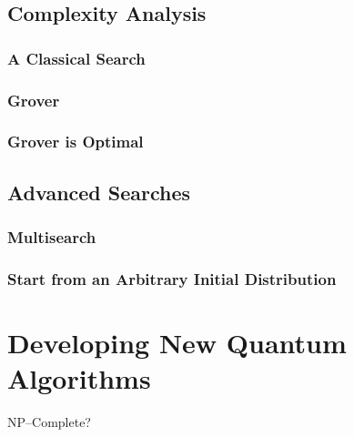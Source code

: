 \subsection{Complexity Analysis}


\subsubsection{A Classical Search}

\subsubsection{Grover}


\subsubsection{Grover is Optimal}


\subsection{Advanced Searches}

\subsubsection{Multisearch}

\subsubsection{Start from an Arbitrary Initial Distribution}


\section{Developing New Quantum Algorithms}

NP--Complete?

